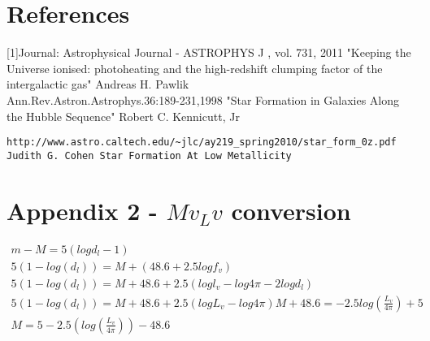 \documentclass[pdf,color]{UoBnote}
\begin{document}
\section{References}

[1]Journal: Astrophysical Journal - ASTROPHYS J , vol. 731, 2011 "Keeping the Universe ionised: photoheating and the high-redshift clumping factor of the intergalactic gas" Andreas H. Pawlik \\
\newline
[2]Ann.Rev.Astron.Astrophys.36:189-231,1998 "Star Formation in Galaxies Along the Hubble Sequence" Robert C. Kennicutt, Jr \\
\newline
[3]\begin{verbatim}http://www.astro.caltech.edu/~jlc/ay219_spring2010/star_form_0z.pdf
Judith G. Cohen Star Formation At Low Metallicity\end{verbatim}

\section{Appendix 2 - $Mv_Lv$ conversion}
\begin{eqnarray}
m-M=5(log d_l - 1)\\
5(1-log (d_l))= M + (48.6+2.5log f_v) \\
5(1-log (d_l))= M + 48.6 + 2.5(log l_v - log 4\pi - 2 log d_l) \\
5(1-log (d_l))= M+48.6 + 2.5(log L_v - log 4\pi)
M+48.6=-2.5 log (\frac{L_v}{4\pi})+5 \\
M=5-2.5(log (\frac{L_v}{4\pi})) - 48.6
\end{eqnarray}
\end{document}
